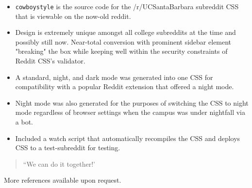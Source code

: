 \documentclass[10pt,letter,ragged2e]{altacv}
\begin{document}
\begin{paracol}{2}
\begin{itemize}
\item \texttt{cowboystyle} is the source code for the /r/UCSantaBarbara subreddit CSS that is viewable on the now-old reddit.
\item Design is extremely unique amongst all college subreddits at the time and possibly still now. Near-total conversion with prominent sidebar element "breaking" the box while keeping well within the security constraints of Reddit CSS's validator.
\item A standard, night, and dark mode was generated into one CSS for compatibility with a popular Reddit extension that offered a night mode.
\item Night mode was also generated for the purposes of switching the CSS to night mode regardless of browser settings when the campus was under nightfall via a bot.
\item Included a watch script that automatically recompiles the CSS and deploys CSS to a test-subreddit for testing.
\end{itemize}

\newpage

\switchcolumn


\begin{quote}
``We can do it together!'
\end{quote}


   

  

 


\medskip






\divider


\divider


\divider

More references available upon request.

\end{paracol}
\end{document}
